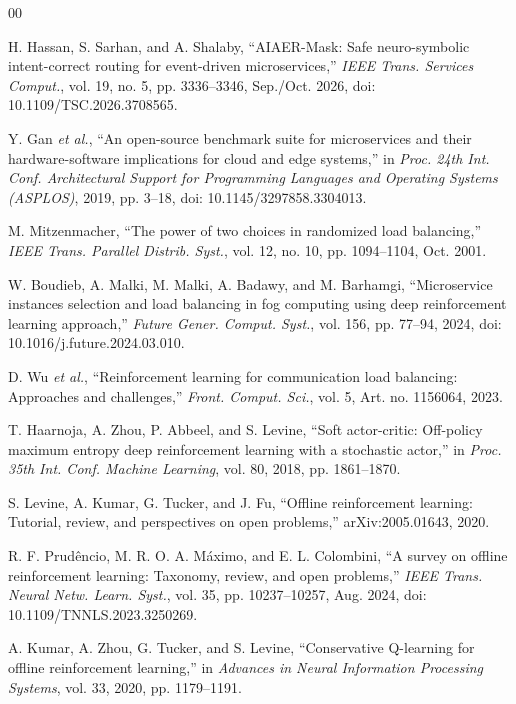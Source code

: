 \documentclass[conference]{IEEEtran}
\begin{document}
\begin{thebibliography}{00}

H. Hassan, S. Sarhan, and A. Shalaby, ``AIAER-Mask: Safe neuro-symbolic intent-correct routing for event-driven microservices,'' \emph{IEEE Trans. Services Comput.}, vol. 19, no. 5, pp. 3336--3346, Sep./Oct. 2026, doi: 10.1109/TSC.2026.3708565.

Y. Gan \emph{et al.}, ``An open-source benchmark suite for microservices and their hardware-software implications for cloud and edge systems,'' in \emph{Proc. 24th Int. Conf. Architectural Support for Programming Languages and Operating Systems (ASPLOS)}, 2019, pp. 3--18, doi: 10.1145/3297858.3304013.

M. Mitzenmacher, ``The power of two choices in randomized load balancing,'' \emph{IEEE Trans. Parallel Distrib. Syst.}, vol. 12, no. 10, pp. 1094--1104, Oct. 2001.

W. Boudieb, A. Malki, M. Malki, A. Badawy, and M. Barhamgi, ``Microservice instances selection and load balancing in fog computing using deep reinforcement learning approach,'' \emph{Future Gener. Comput. Syst.}, vol. 156, pp. 77--94, 2024, doi: 10.1016/j.future.2024.03.010.

D. Wu \emph{et al.}, ``Reinforcement learning for communication load balancing: Approaches and challenges,'' \emph{Front. Comput. Sci.}, vol. 5, Art. no. 1156064, 2023.

T. Haarnoja, A. Zhou, P. Abbeel, and S. Levine, ``Soft actor-critic: Off-policy maximum entropy deep reinforcement learning with a stochastic actor,'' in \emph{Proc. 35th Int. Conf. Machine Learning}, vol. 80, 2018, pp. 1861--1870.

S. Levine, A. Kumar, G. Tucker, and J. Fu, ``Offline reinforcement learning: Tutorial, review, and perspectives on open problems,'' arXiv:2005.01643, 2020.

R. F. Prud\^encio, M. R. O. A. M\'aximo, and E. L. Colombini, ``A survey on offline reinforcement learning: Taxonomy, review, and open problems,'' \emph{IEEE Trans. Neural Netw. Learn. Syst.}, vol. 35, pp. 10237--10257, Aug. 2024, doi: 10.1109/TNNLS.2023.3250269.

A. Kumar, A. Zhou, G. Tucker, and S. Levine, ``Conservative Q-learning for offline reinforcement learning,'' in \emph{Advances in Neural Information Processing Systems}, vol. 33, 2020, pp. 1179--1191.


\end{thebibliography}
\end{document}
